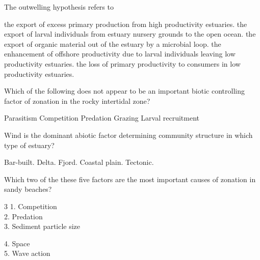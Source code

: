 \question
The outwelling hypothesis refers to

\begin{choices}
\correctchoice the export of excess primary production from high productivity estuaries. %
\choice the export of larval individuals from estuary nursery grounds to the open ocean.%
\choice the export of organic material out of the estuary by a microbial loop.%
\choice the enhancement of offshore productivity due to larval individuals leaving low productivity estuaries.%
\choice the loss of primary productivity to consumers in low productivity estuaries.%
\end{choices}

\question
Which of the following does not appear to be an important biotic controlling factor of zonation in the rocky intertidal zone?

\begin{choices}
\correctchoice Parasitism %
\choice  Competition  %
\choice Predation %
\choice Grazing %
\choice Larval recruitment %
\end{choices}

\question
Wind is the dominant abiotic factor determining community structure in which type of estuary?

\begin{choices}
\correctchoice Bar-built. %
\choice Delta. %
\choice Fjord. %
\choice Coastal plain. %
\choice Tectonic. %
\end{choices}

\question
Which two of the these five factors are the most important causes of zonation in sandy beaches?
\begin{multicols}{3}
1. Competition \\
2. Predation \\
3. Sediment particle size\\

\columnbreak

4. Space\\
5. Wave action\\
\phantom{6.} \null

\columnbreak

\phantom{7.}

\end{multicols}\vspace*{-1ex}

